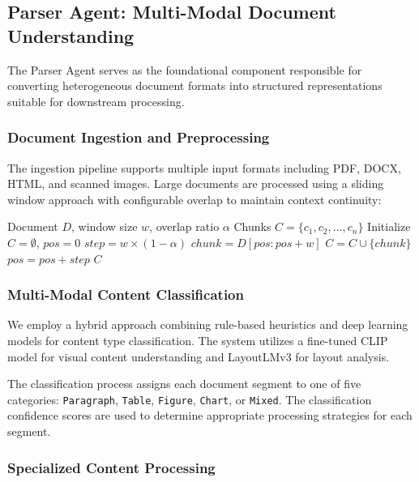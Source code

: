 \documentclass[11pt,a4paper]{article}
\begin{document}
\subsection{Parser Agent: Multi-Modal Document Understanding}

The Parser Agent serves as the foundational component responsible for converting heterogeneous document formats into structured representations suitable for downstream processing.

\subsubsection{Document Ingestion and Preprocessing}

The ingestion pipeline supports multiple input formats including PDF, DOCX, HTML, and scanned images. Large documents are processed using a sliding window approach with configurable overlap to maintain context continuity:

\begin{algorithm}[H]
\caption{Document Chunking Algorithm}
\begin{algorithmic}[1]
\REQUIRE Document $D$, window size $w$, overlap ratio $\alpha$
\ENSURE Chunks $C = \{c_1, c_2, ..., c_n\}$
\STATE Initialize $C = \emptyset$, $pos = 0$
\STATE $step = w \times (1 - \alpha)$
    \STATE $chunk = D[pos:pos+w]$
    \STATE $C = C \cup \{chunk\}$
    \STATE $pos = pos + step$
\ENDWHILE
\RETURN $C$
\end{algorithmic}
\end{algorithm}

\subsubsection{Multi-Modal Content Classification}

We employ a hybrid approach combining rule-based heuristics and deep learning models for content type classification. The system utilizes a fine-tuned CLIP model \citep{radford2021learning} for visual content understanding and LayoutLMv3 \citep{li2024layoutlmv3} for layout analysis.

The classification process assigns each document segment to one of five categories: \texttt{Paragraph}, \texttt{Table}, \texttt{Figure}, \texttt{Chart}, or \texttt{Mixed}. The classification confidence scores are used to determine appropriate processing strategies for each segment.

\subsubsection{Specialized Content Processing}
\end{document}
